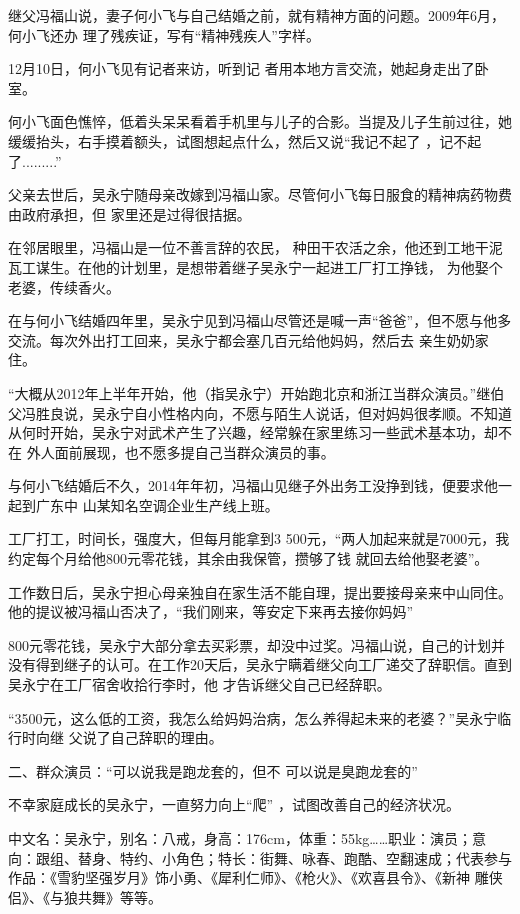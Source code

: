 \documentclass{article}
\begin{document}
继父冯福山说，妻子何小飞与自己结婚之前，就有精神方面的问题。2009年6月，何小飞还办
理了残疾证，写有“精神残疾人”字样。 

12月10日，何小飞见有记者来访，听到记
者用本地方言交流，她起身走出了卧室。 

何小飞面色憔悴，低着头呆呆看着手机里与儿子的合影。当提及儿子生前过往，她缓缓抬头，右手摸着额头，试图想起点什么，然后又说“我记不起了
，记不起了.........” 

父亲去世后，吴永宁随母亲改嫁到冯福山家。尽管何小飞每日服食的精神病药物费由政府承担，但
家里还是过得很拮据。 

在邻居眼里，冯福山是一位不善言辞的农民，
\newpage
种田干农活之余，他还到工地干泥瓦工谋生。在他的计划里，是想带着继子吴永宁一起进工厂打工挣钱，
为他娶个老婆，传续香火。 

在与何小飞结婚四年里，吴永宁见到冯福山尽管还是喊一声“爸爸”，但不愿与他多交流。每次外出打工回来，吴永宁都会塞几百元给他妈妈，然后去
亲生奶奶家住。 

“大概从2012年上半年开始，他（指吴永宁）开始跑北京和浙江当群众演员。”继伯父冯胜良说，吴永宁自小性格内向，不愿与陌生人说话，但对妈妈很孝顺。不知道从何时开始，吴永宁对武术产生了兴趣，经常躲在家里练习一些武术基本功，却不在
外人面前展现，也不愿多提自己当群众演员的事。 

与何小飞结婚后不久，2014年年初，冯福山见继子外出务工没挣到钱，便要求他一起到广东中
山某知名空调企业生产线上班。 

工厂打工，时间长，强度大，但每月能拿到3
\newpage
500元，“两人加起来就是7000元，我约定每个月给他800元零花钱，其余由我保管，攒够了钱
就回去给他娶老婆”。 

工作数日后，吴永宁担心母亲独自在家生活不能自理，提出要接母亲来中山同住。他的提议被冯福山否决了，“我们刚来，等安定下来再去接你妈妈”

800元零花钱，吴永宁大部分拿去买彩票，却没中过奖。冯福山说，自己的计划并没有得到继子的认可。在工作20天后，吴永宁瞒着继父向工厂递交了辞职信。直到吴永宁在工厂宿舍收拾行李时，他
才告诉继父自己已经辞职。 

“3500元，这么低的工资，我怎么给妈妈治病，怎么养得起未来的老婆？”吴永宁临行时向继
父说了自己辞职的理由。 

二、群众演员：“可以说我是跑龙套的，但不
可以说是臭跑龙套的” 

\newpage

不幸家庭成长的吴永宁，一直努力向上“爬”
，试图改善自己的经济状况。 

中文名：吴永宁，别名：八戒，身高：176cm，体重：55kg……职业：演员；意向：跟组、替身、特约、小角色；特长：街舞、咏春、跑酷、空翻速成；代表参与作品：《雪豹坚强岁月》饰小勇、《犀利仁师》、《枪火》、《欢喜县令》、《新神
雕侠侣》、《与狼共舞》等等。 
\end{document}
